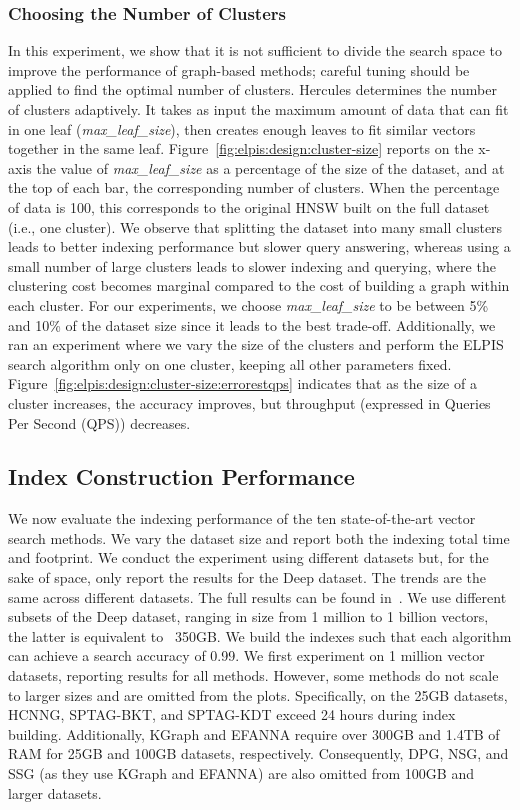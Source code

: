 \subsubsection{Choosing the Number of Clusters}
In this experiment, we show that it is not sufficient to divide the search space to improve the performance of graph-based methods; careful tuning should be applied to find the optimal number of clusters. 
Hercules determines the number of clusters adaptively. It takes as input the maximum amount of data that can fit in one leaf ({\it max\_leaf\_size}), then creates enough leaves to fit similar vectors together in the same leaf. 
Figure~\ref{fig:elpis:design:cluster-size} reports on the x-axis the value of {\it max\_leaf\_size} as a percentage of the size of the dataset, and at the top of each bar, the corresponding number of clusters. 
When the percentage of data is 100, this corresponds to the original HNSW built on the full dataset (i.e., one cluster). 
We observe that splitting the dataset into many small clusters leads to better indexing performance but slower query answering, whereas using a small number of large clusters leads to slower indexing and querying, where the clustering cost becomes marginal compared to the cost of building a graph within each cluster. 
For our experiments, we choose {\it max\_leaf\_size} to be between 5\% and 10\% of the dataset size since it leads to the best trade-off. 
Additionally, we ran an experiment where we vary the size of the clusters and perform the ELPIS search algorithm only on one cluster, keeping all other parameters fixed. 
Figure~\ref{fig:elpis:design:cluster-size:errorestqps} indicates that as the size of a cluster increases, the accuracy improves, but throughput (expressed in Queries Per Second (QPS)) decreases.


\subsection{Index Construction Performance}
We now evaluate the indexing performance of the ten state-of-the-art vector search methods.
We vary the dataset size and report both the indexing total time and footprint. We conduct the experiment using different datasets but, for the sake of space, only report the results for the Deep dataset. The trends are the same across different datasets. The full results can be found in~\cite{url/GASS}.
We use different subsets of the Deep dataset, ranging in size from 1 million to 1 billion vectors, the latter is equivalent to ~350GB. We build the indexes such that each algorithm can achieve a search accuracy of 0.99. 
We first experiment on 1 million vector datasets, reporting results for all methods. However, some methods do not scale to larger sizes and are omitted from the plots. Specifically, on the 25GB datasets, HCNNG, SPTAG-BKT, and SPTAG-KDT exceed 24 hours during index building. Additionally, KGraph and EFANNA require over 300GB and 1.4TB of RAM for 25GB and 100GB datasets, respectively. Consequently, DPG, NSG, and SSG (as they use KGraph and EFANNA) are also omitted from 100GB and larger datasets.



